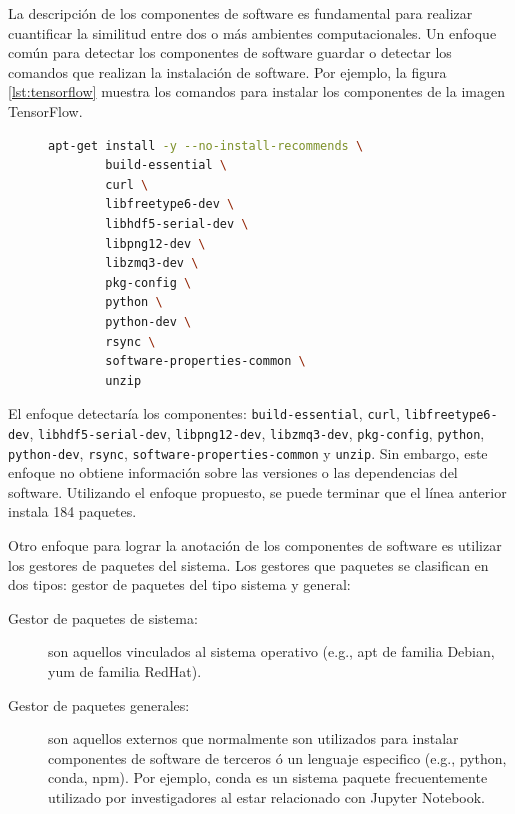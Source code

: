 La descripción de los componentes de software es fundamental para realizar cuantificar la similitud entre dos o más ambientes computacionales.
Un enfoque común para detectar los componentes de software guardar o detectar los comandos que realizan la instalación de software. Por ejemplo, la figura \ref{lst:tensorflow} muestra los comandos para instalar los componentes de la imagen TensorFlow. 
\begin{figure}
	\begin{lstlisting}[caption={Ejemplo de instalación de dependencias para la imagen TensorFlow},label={lst:tensorflow},language=bash]
apt-get install -y --no-install-recommends \
        build-essential \
        curl \
        libfreetype6-dev \
        libhdf5-serial-dev \
        libpng12-dev \
        libzmq3-dev \
        pkg-config \
        python \
        python-dev \
        rsync \
        software-properties-common \
        unzip	
\end{lstlisting}

\end{figure}


El enfoque detectaría los componentes: \verb|build-essential|, \verb|curl|, \verb|libfreetype6-dev|, \verb|libhdf5-serial-dev|, \verb|libpng12-dev|, \verb|libzmq3-dev|, \verb|pkg-config|, \verb|python|, \verb|python-dev|, \verb|rsync|, \verb|software-properties-common| y  \verb|unzip|. Sin embargo, este enfoque no obtiene información sobre las versiones o las dependencias del software. Utilizando el  enfoque propuesto, se puede terminar que el línea anterior instala 184 paquetes.

Otro enfoque  para lograr la anotación de los componentes de software es utilizar los gestores de paquetes del sistema. Los gestores que paquetes se clasifican en dos tipos: gestor de paquetes del tipo sistema y general:

\begin{description}
	\item  [Gestor de paquetes de sistema:] son aquellos vinculados al sistema operativo (e.g., apt de familia Debian, yum de familia RedHat).
	\item [Gestor de paquetes generales:] son aquellos externos que normalmente son utilizados para instalar componentes de software de terceros ó un lenguaje especifico (e.g., python, conda, npm). Por ejemplo, conda es un sistema paquete frecuentemente utilizado por investigadores al estar relacionado con Jupyter Notebook.
\end{description}


